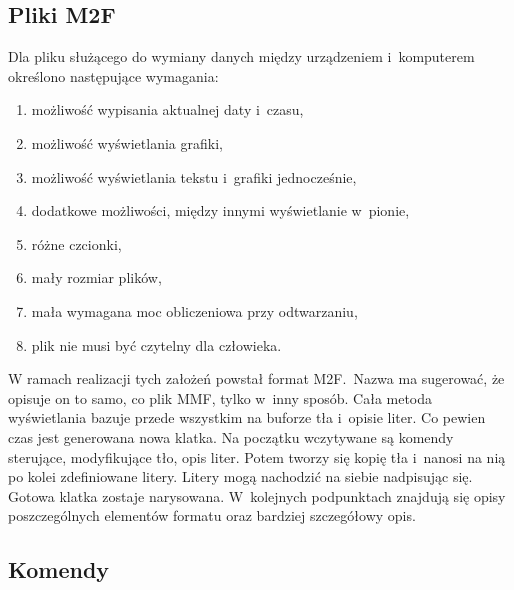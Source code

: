 \subsection{Pliki M2F}
\label{m2f-desc}
Dla pliku służącego do wymiany danych między urządzeniem i~komputerem określono następujące wymagania: 
\begin{enumerate}
	\item możliwość wypisania aktualnej daty i~czasu,
	\item możliwość wyświetlania grafiki,
	\item możliwość wyświetlania tekstu i~grafiki jednocześnie,
	\item dodatkowe możliwości, między innymi wyświetlanie w~pionie,
	\item różne czcionki,
	\item mały rozmiar plików,
	\item mała wymagana moc obliczeniowa przy odtwarzaniu,
	\item plik nie musi być czytelny dla człowieka.
\end{enumerate}
W ramach realizacji tych założeń powstał format M2F.~Nazwa ma sugerować, że opisuje on to samo, co plik MMF, tylko w~inny sposób. Cała metoda wyświetlania bazuje przede wszystkim na buforze tła i~opisie liter. Co pewien czas jest generowana nowa klatka. Na początku wczytywane są komendy sterujące, modyfikujące tło, opis liter. Potem tworzy się kopię tła i~nanosi na nią po kolei zdefiniowane litery. Litery mogą nachodzić na siebie nadpisując się. Gotowa klatka zostaje narysowana. W~kolejnych podpunktach znajdują się opisy poszczególnych elementów formatu oraz bardziej szczegółowy opis.

\subsection{Komendy}
